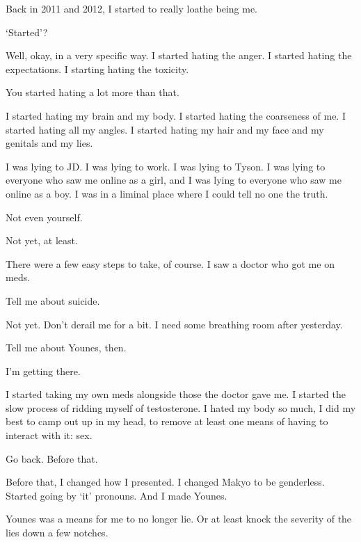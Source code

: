 \label{furry:younes}
\begin{paracol}{2}
  \begin{leftcolumn}

\noindent Back in 2011 and 2012, I started to really loathe being me.

\begin{ally}
`Started'?
\end{ally}
Well, okay, in a very specific way. I started hating the anger. I started hating the expectations. I starting hating the toxicity.

\begin{ally}
You started hating a lot more than that.
\end{ally}
I started hating my brain and my body. I started hating the coarseness of me. I started hating all my angles. I started hating my hair and my face and my genitals and my lies.

I was lying to JD. I was lying to work. I was lying to Tyson. I was lying to everyone who saw me online as a girl, and I was lying to everyone who saw me online as a boy. I was in a liminal place where I could tell no one the truth.

\begin{ally}
Not even yourself.
\end{ally}
Not yet, at least.

There were a few easy steps to take, of course. I saw a doctor who got me on meds.

\begin{ally}
Tell me about suicide.
\end{ally}
Not yet. Don't derail me for a bit. I need some breathing room after yesterday.

\begin{ally}
Tell me about Younes, then.
\end{ally}
I'm getting there.

I started taking my own meds alongside those the doctor gave me. I started the slow process of ridding myself of testosterone. I hated my body so much, I did my best to camp out up in my head, to remove at least one means of having to interact with it: sex.

\begin{ally}
Go back. Before that.
\end{ally}
Before that, I changed how I presented. I changed Makyo to be genderless. Started going by `it' pronouns. And I made Younes.

Younes was a means for me to no longer lie. Or at least knock the severity of the lies down a few notches.


\end{leftcolumn}
\end{paracol}
